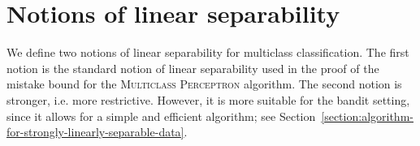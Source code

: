 \documentclass[12pt]{article}
\begin{document}











\section{Notions of linear separability}
\label{section:notions-of-linear-separability}

We define two notions of linear separability for multiclass classification. The
first notion is the standard notion of linear separability used in the proof of
the mistake bound for the \textsc{Multiclass Perceptron} algorithm. The second
notion is stronger, i.e. more restrictive. However, it is more suitable for the
bandit setting, since it allows for a simple and efficient algorithm; see
Section~\ref{section:algorithm-for-strongly-linearly-separable-data}.
\end{document}
